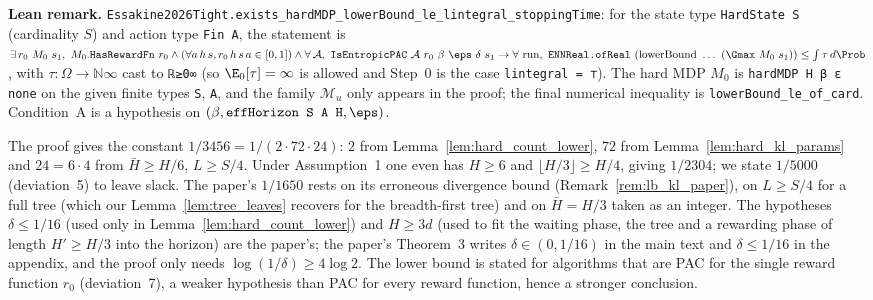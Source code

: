 \textbf{Lean remark.} \texttt{Essakine2026Tight.exists\_hardMDP\_lowerBound\_le\_lintegral\_stoppingTime}:
for the state type \texttt{HardState S} (cardinality $S$) and action type \texttt{Fin A}, the
statement is
$\exists\, r_0\ M_0\ s_1,\ M_0.\texttt{HasRewardFn}\ r_0 \wedge (\forall a\, h\, s, r_0\, h\, s\, a \in [0,1]) \wedge
\forall\, \mathcal A,\ \texttt{IsEntropicPAC}\ \mathcal A\ r_0\ \beta\ \eps\ \delta\ s_1 \to \forall \text{ run},\
\texttt{ENNReal.ofReal}\ (\mathrm{lowerBound}\ \dots\ (\Gmax\ M_0\ s_1)) \le \int \tau\, d\Prob$,
with $\tau : \Omega \to \texttt{ℕ∞}$ cast to \texttt{ℝ≥0∞} (so $\E_0[\tau] = \infty$ is allowed and
Step~0 is the case \texttt{lintegral = ⊤}). The hard MDP $M_0$ is \texttt{hardMDP H β ε none} on the
given finite types \texttt{S}, \texttt{A}, and the family $\mathcal M_u$ only appears in the proof; the final
numerical inequality is \texttt{lowerBound\_le\_of\_card}. Condition~A is a hypothesis on
$(\beta, \texttt{effHorizon S A H}, \eps)$.

\begin{remark}\label{rem:lb_constant}
The proof gives the constant $1/3456 = 1/(2\cdot 72\cdot 24)$: $2$ from
Lemma~\ref{lem:hard_count_lower}, $72$ from Lemma~\ref{lem:hard_kl_params} and $24 = 6\cdot 4$
from $\bar H \ge H/6$, $L \ge S/4$. Under Assumption~1 one even has $H \ge 6$ and
$\lfloor H/3\rfloor \ge H/4$, giving $1/2304$; we state $1/5000$ (deviation~5) to leave slack.
The paper's $1/1650$ rests on its erroneous divergence bound (Remark~\ref{rem:lb_kl_paper}),
on $L \ge S/4$ for a full tree (which our Lemma~\ref{lem:tree_leaves} recovers for the
breadth-first tree) and on $\bar H = H/3$ taken as an integer. The hypotheses $\delta \le 1/16$
(used only in Lemma~\ref{lem:hard_count_lower}) and $H \ge 3d$ (used to fit the waiting phase,
the tree and a rewarding phase of length $H' \ge H/3$ into the horizon) are the paper's; the
paper's Theorem~3 writes $\delta \in (0, 1/16)$ in the main text and $\delta \le 1/16$ in the
appendix, and the proof only needs $\log(1/\delta) \ge 4\log 2$. The lower bound is stated for
algorithms that are PAC for the single reward function $r_0$ (deviation~7), a weaker hypothesis
than PAC for every reward function, hence a stronger conclusion.
\end{remark}
